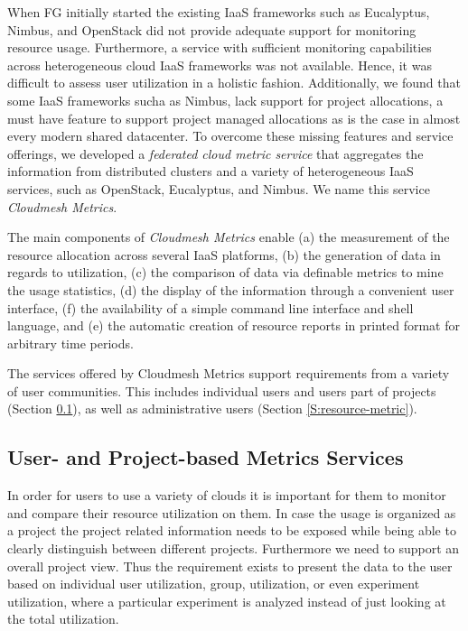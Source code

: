 \documentclass{tex/sig-alternate}
\begin{document}
{When FG initially started the existing IaaS frameworks such as
Eucalyptus, Nimbus, and OpenStack did not provide adequate support for
monitoring resource usage. Furthermore, a service with sufficient
monitoring capabilities across heterogeneous cloud IaaS frameworks was
not available. Hence, it was difficult to assess user utilization in a
holistic fashion. Additionally, we found that some IaaS frameworks
sucha as Nimbus, lack support for project allocations, a must have
feature to support project managed allocations as is the case in
almost every modern shared datacenter.  To overcome these missing
features and service offerings, we developed a {\em federated cloud metric
service} that aggregates the information from distributed clusters and a
variety of heterogeneous IaaS services, such as OpenStack, Eucalyptus,
and Nimbus. We name this service {\em Cloudmesh Metrics}.

The main components of {\em Cloudmesh Metrics} enable (a) the
measurement of the resource allocation across several IaaS platforms,
(b) the generation of data in regards to utilization, (c) the
comparison of data via definable metrics to mine the usage statistics,
(d) the display of the information through a convenient user
interface, (f) the availability of a simple command line interface and
shell language, and (e) the automatic creation of resource reports in
printed format for arbitrary time periods.

The services offered by Cloudmesh Metrics support requirements from a
variety of user communities. This includes individual users and users
part of projects (Section \ref{S:user-metric}), as well as administrative users
(Section \ref{S:resource-metric}).


\subsection{User- and Project-based Metrics Services}\label{S:user-metric} 

In order for users to use a variety of clouds it is important for them
to monitor and compare their resource utilization on them. In case the
usage is organized as a project the project related information needs
to be exposed while being able to clearly distinguish between
different projects. Furthermore we need to support an overall project
view.  Thus the requirement exists to present the data to the user
based on individual user utilization, group, utilization, or even
experiment utilization, where a particular experiment is analyzed
instead of just looking at the total utilization.

}
\end{document}
